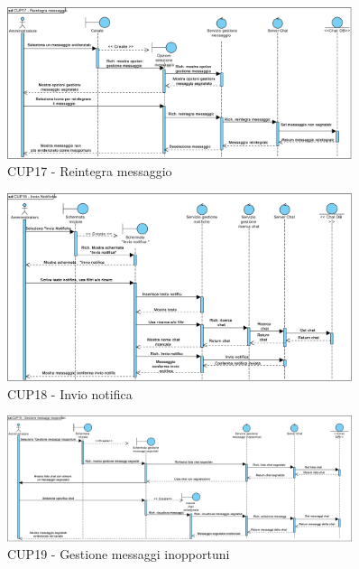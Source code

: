 \begin{figure}
	\centering
	\includegraphics[width=0.9\textwidth]{imgs/gruppo6/sequence/seq_cup17_reintegra_messaggio.pdf}
	\caption{CUP17 - Reintegra messaggio}
	\label{fig:seq-cup17}
\end{figure}

\begin{figure}
	\centering
	\includegraphics[width=0.9\textwidth]{imgs/gruppo6/sequence/CUP18_invio_notifica.pdf}
	\caption{CUP18 - Invio notifica}
	\label{fig:seq-cup18}
\end{figure}


\begin{figure}
	\centering
	\includegraphics[width=0.9\textwidth]{imgs/gruppo6/sequence/CUP19_gestione_messaggi_inopportuni.pdf}
	\caption{CUP19 - Gestione messaggi inopportuni}
	\label{fig:seq-cup19}
\end{figure}

\clearpage

